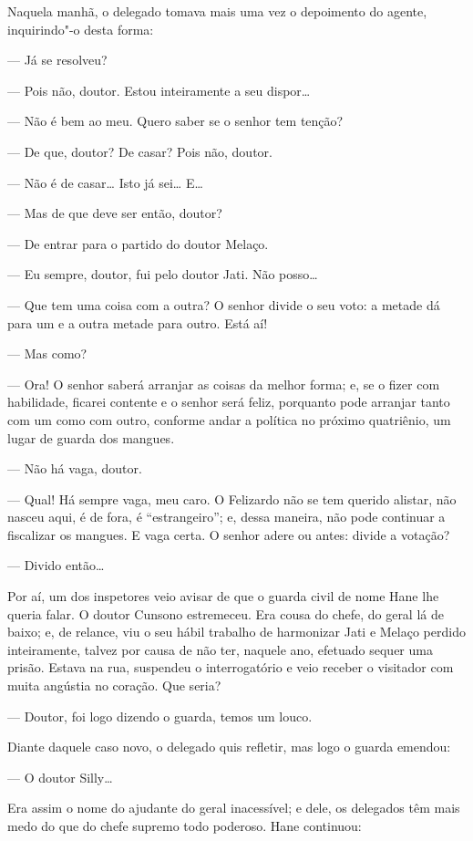 Naquela manhã, o delegado tomava mais uma vez o depoimento do agente,
inquirindo"-o desta forma:

--- Já se resolveu?

--- Pois não, doutor. Estou inteiramente a seu dispor\ldots{}

--- Não é bem ao meu. Quero saber se o senhor tem tenção?

--- De que, doutor? De casar? Pois não, doutor.

--- Não é de casar\ldots{} Isto já sei\ldots{} E\ldots{}

--- Mas de que deve ser então, doutor?

--- De entrar para o partido do doutor Melaço.

--- Eu sempre, doutor, fui pelo doutor Jati. Não posso\ldots{}

--- Que tem uma coisa com a outra? O senhor divide o seu voto: a metade
dá para um e a outra metade para outro. Está aí!

--- Mas como?

--- Ora! O senhor saberá arranjar as coisas da melhor forma; e, se o
fizer com habilidade, ficarei contente e o senhor será feliz, porquanto
pode arranjar tanto com um como com outro, conforme andar a política no
próximo quatriênio, um lugar de guarda dos mangues.

--- Não há vaga, doutor.

--- Qual! Há sempre vaga, meu caro. O Felizardo não se tem querido
alistar, não nasceu aqui, é de fora, é ``estrangeiro''; e, dessa maneira,
não pode continuar a fiscalizar os mangues. E vaga certa. O senhor adere
ou antes: divide a votação?

--- Divido então\ldots{}

Por aí, um dos inspetores veio avisar de que o guarda civil de nome Hane
lhe queria falar. O doutor Cunsono estremeceu. Era cousa do chefe, do
geral lá de baixo; e, de relance, viu o seu hábil trabalho de harmonizar
Jati e Melaço perdido inteiramente, talvez por causa de não ter, naquele
ano, efetuado sequer uma prisão. Estava na rua, suspendeu o
interrogatório e veio receber o visitador com muita angústia no coração.
Que seria?

--- Doutor, foi logo dizendo o guarda, temos um louco.

Diante daquele caso novo, o delegado quis refletir, mas logo o guarda
emendou:

--- O doutor Silly\ldots{}

Era assim o nome do ajudante do geral inacessível; e dele, os delegados
têm mais medo do que do chefe supremo todo poderoso. Hane continuou:

